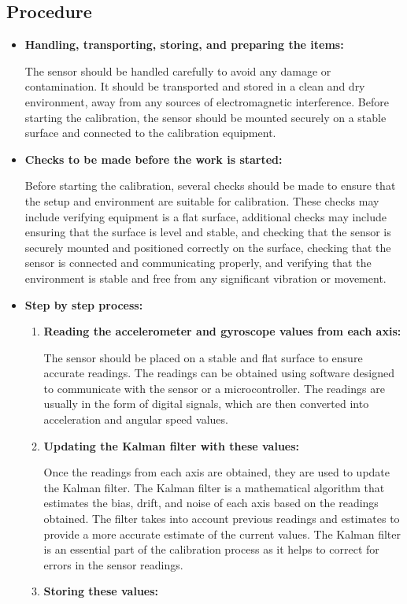 \subsection{Procedure}

\begin{itemize}
	\item \textbf{Handling, transporting, storing, and preparing the items: }
	
	The sensor should be handled carefully to avoid any damage or contamination. It should be transported and stored in a clean and dry environment, away from any sources of electromagnetic interference. Before starting the calibration, the sensor should be mounted securely on a stable surface and connected to the calibration equipment.
	
	\item \textbf{Checks to be made before the work is started: } 
	
	Before starting the calibration, several checks should be made to ensure that the setup and environment are suitable for calibration. These checks may include verifying equipment is a flat surface, additional checks may include ensuring that the surface is level and stable, and checking that the sensor is securely mounted and positioned correctly on the surface, checking that the sensor is connected and communicating properly, and verifying that the environment is stable and free from any significant vibration or movement.
	
	\item \textbf{Step by step process:}
	
	\begin{enumerate}
		
		\item \textbf{Reading the accelerometer and gyroscope values from each axis: }
		
		The sensor should be placed on a stable and flat surface to ensure accurate readings. The readings can be obtained using software designed to communicate with the sensor or a microcontroller. The readings are usually in the form of digital signals, which are then converted into acceleration and angular speed values.
		\item \textbf{Updating the Kalman filter with these values:}
		
		Once the readings from each axis are obtained, they are used to update the Kalman filter. The Kalman filter is a mathematical algorithm that estimates the bias, drift, and noise of each axis based on the readings obtained. The filter takes into account previous readings and estimates to provide a more accurate estimate of the current values. The Kalman filter is an essential part of the calibration process as it helps to correct for errors in the sensor readings.
		\item \textbf{Storing these values:}
		

\end{enumerate}
\end{itemize}
